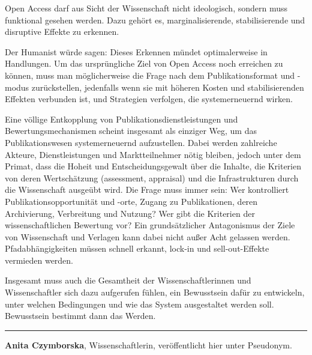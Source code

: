 \documentclass[a4paper,
fontsize=11pt,
oneside,
numbers=noperiodatend,
parskip=half-,
bibliography=totoc,
final
]{scrartcl}
\begin{document}
Open Access darf aus Sicht der Wissenschaft nicht ideologisch, sondern
muss funktional gesehen werden. Dazu gehört es, marginalisierende,
stabilisierende und disruptive Effekte zu erkennen.

Der Humanist würde sagen: Dieses Erkennen mündet optimalerweise in
Handlungen. Um das ursprüngliche Ziel von Open Access noch erreichen zu
können, muss man möglicherweise die Frage nach dem Publikationsformat
und -modus zurückstellen, jedenfalls wenn sie mit höheren Kosten und
stabilisierenden Effekten verbunden ist, und Strategien verfolgen, die
systemerneuernd wirken.

Eine völlige Entkopplung von Publikationsdienstleistungen und
Bewertungsmechanismen scheint insgesamt als einziger Weg, um das
Publikationswesen systemerneuernd aufzustellen. Dabei werden zahlreiche
Akteure, Dienstleistungen und Marktteilnehmer nötig bleiben, jedoch
unter dem Primat, dass die Hoheit und Entscheidungsgewalt über die
Inhalte, die Kriterien von deren Wertschätzung (assessment, appraisal)
und die Infrastrukturen durch die Wissenschaft ausgeübt wird. Die Frage
muss immer sein: Wer kontrolliert Publikationsopportunität und -orte,
Zugang zu Publikationen, deren Archivierung, Verbreitung und Nutzung?
Wer gibt die Kriterien der wissenschaftlichen Bewertung vor? Ein
grundsätzlicher Antagonismus der Ziele von Wissenschaft und Verlagen
kann dabei nicht außer Acht gelassen werden. Pfadabhängigkeiten müssen
schnell erkannt, lock-in und sell-out-Effekte vermieden werden.

Insgesamt muss auch die Gesamtheit der Wissenschaftlerinnen und
Wissenschaftler sich dazu aufgerufen fühlen, ein Bewusstsein dafür zu
entwickeln, unter welchen Bedingungen und wie das System ausgestaltet
werden soll. Bewusstsein bestimmt dann das Werden.

\begin{center}\rule{0.5\linewidth}{\linethickness}\end{center}

\textbf{Anita Czymborska}, Wissenschaftlerin, veröffentlicht hier unter
Pseudonym.
\end{document}
